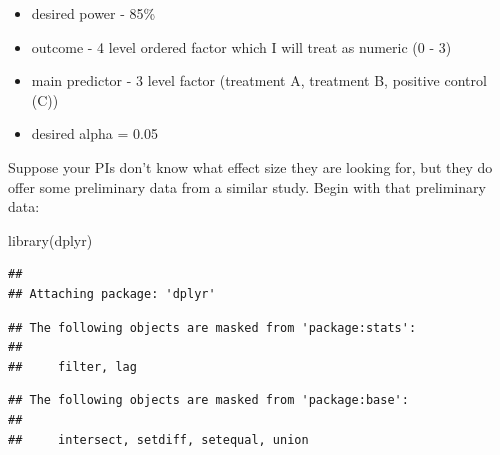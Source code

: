 \documentclass[
]{book}
\newenvironment{Shaded}{\begin{snugshade}}{\end{snugshade}}
\newcommand{\FunctionTok}[1]{\textcolor[rgb]{0.00,0.00,0.00}{#1}}
\newcommand{\NormalTok}[1]{#1}
\providecommand{\tightlist}{%
  \setlength{\itemsep}{0pt}\setlength{\parskip}{0pt}}
\begin{document}
\begin{itemize}
\tightlist
\item
  desired power - 85\%
\item
  outcome - 4 level ordered factor which I will treat as numeric (0 - 3)
\item
  main predictor - 3 level factor (treatment A, treatment B, positive control (C))
\item
  desired alpha = 0.05
\end{itemize}

Suppose your PIs don't know what effect size they are looking for, but they do offer some preliminary data from a similar study. Begin with that preliminary data:

\begin{Shaded}
\begin{Highlighting}[]
\FunctionTok{library}\NormalTok{(dplyr)}
\end{Highlighting}
\end{Shaded}

\begin{verbatim}
## 
## Attaching package: 'dplyr'
\end{verbatim}

\begin{verbatim}
## The following objects are masked from 'package:stats':
## 
##     filter, lag
\end{verbatim}

\begin{verbatim}
## The following objects are masked from 'package:base':
## 
##     intersect, setdiff, setequal, union
\end{verbatim}
\end{document}
